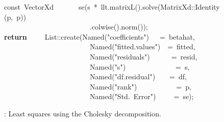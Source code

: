 \documentclass[shortnames,article,nojss]{jss}
\newcommand{\hlstd}[1]{\textcolor[rgb]{0,0,0}{#1}}
\newcommand{\hlopt}[1]{\textcolor[rgb]{0,0,0}{#1}}
\newcommand{\hlstr}[1]{\textcolor[rgb]{0.90,0.15,0.15}{#1}}
\newcommand{\hlkwa}[1]{\textcolor[rgb]{0.61,0.13,0.93}{\bf{#1}}}
\newcommand{\hlkwb}[1]{\textcolor[rgb]{0.13,0.54,0.13}{#1}}
\newcommand{\hlkwd}[1]{\textcolor[rgb]{0,0,0}{#1}}
\begin{document}
\begin{figure}[tbh]
  \hlstd{}\hlkwb{const\ }\hlstd{VectorXd}\hlstd{\ \ \ \ \ \ \ }\hlstd{}\hlkwd{se}\hlstd{}\hlopt{(}\hlstd{s\ }\hlopt{{*}\ }\hlstd{llt}\hlopt{.}\hlstd{}\hlkwd{matrixL}\hlstd{}\hlopt{().}\hlstd{}\hlkwd{solve}\hlstd{}\hlopt{(}\hlstd{MatrixXd}\hlopt{::}\hlstd{}\hlkwd{Identity}\hlstd{}\hlopt{(}\hlstd{p}\hlopt{,\ }\hlstd{p}\hlopt{))}\hspace*{\fill}\\
  \hlstd{}\hlstd{\ \ \ \ \ \ \ \ \ \ \ \ \ \ \ \ \ \ \ \ \ \ \ \ }\hlstd{}\hlopt{.}\hlstd{}\hlkwd{colwise}\hlstd{}\hlopt{().}\hlstd{}\hlkwd{norm}\hlstd{}\hlopt{());}\hspace*{\fill}\\
  \hlstd{}\hlkwa{return}\hlstd{\ \ \ \ \ }\hlkwa{}\hlstd{List}\hlopt{::}\hlstd{}\hlkwd{create}\hlstd{}\hlopt{(}\hlstd{Named}\hlopt{{(}}\hlstd{}\hlstr{"coefficients"}\hlstd{}\hlopt{{)}}\hlstd{\ \ \ }\hlopt{=\ }\hlstd{betahat}\hlopt{,}\hspace*{\fill}\\
  \hlstd{}\hlstd{\ \ \ \ \ \ \ \ \ \ \ \ \ \ \ \ \ \ \ \ \ \ \ \ }\hlstd{Named}\hlopt{{(}}\hlstd{}\hlstr{"fitted.values"}\hlstd{}\hlopt{{)}}\hlstd{\ \ }\hlopt{=\ }\hlstd{fitted}\hlopt{,}\hspace*{\fill}\\
  \hlstd{}\hlstd{\ \ \ \ \ \ \ \ \ \ \ \ \ \ \ \ \ \ \ \ \ \ \ \ }\hlstd{Named}\hlopt{{(}}\hlstd{}\hlstr{"residuals"}\hlstd{}\hlopt{{)}}\hlstd{\ \ \ \ \ \ }\hlopt{=\ }\hlstd{resid}\hlopt{,}\hspace*{\fill}\\
  \hlstd{}\hlstd{\ \ \ \ \ \ \ \ \ \ \ \ \ \ \ \ \ \ \ \ \ \ \ \ }\hlstd{Named}\hlopt{{(}}\hlstd{}\hlstr{"s"}\hlstd{}\hlopt{{)}}\hlstd{\ \ \ \ \ \ \ \ \ \ \ \ \ \ }\hlopt{=\ }\hlstd{s}\hlopt{,}\hspace*{\fill}\\
  \hlstd{}\hlstd{\ \ \ \ \ \ \ \ \ \ \ \ \ \ \ \ \ \ \ \ \ \ \ \ }\hlstd{Named}\hlopt{{(}}\hlstd{}\hlstr{"df.residual"}\hlstd{}\hlopt{{)}}\hlstd{\ \ \ \ }\hlopt{=\ }\hlstd{df}\hlopt{,}\hspace*{\fill}\\
  \hlstd{}\hlstd{\ \ \ \ \ \ \ \ \ \ \ \ \ \ \ \ \ \ \ \ \ \ \ \ }\hlstd{Named}\hlopt{{(}}\hlstd{}\hlstr{"rank"}\hlstd{}\hlopt{{)}}\hlstd{\ \ \ \ \ \ \ \ \ \ \ }\hlopt{=\ }\hlstd{p}\hlopt{,}\hspace*{\fill}\\
  \hlstd{}\hlstd{\ \ \ \ \ \ \ \ \ \ \ \ \ \ \ \ \ \ \ \ \ \ \ \ }\hlstd{Named}\hlopt{{(}}\hlstd{}\hlstr{"Std.\ Error"}\hlstd{}\hlopt{{)}}\hlstd{\ \ \ \ \ }\hlopt{=\ }\hlstd{se}\hlopt{);}\hlstd{}\hspace*{\fill}\\
  \mbox{}
  \normalfont
  \normalsize
  \caption{: Least squares using the Cholesky decomposition.}
  \label{lltLS}
\end{figure}
\end{document}

